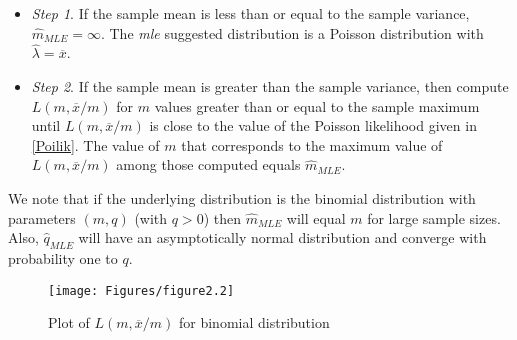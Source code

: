 \documentclass[]{book}
\providecommand{\tightlist}{%
  \setlength{\itemsep}{0pt}\setlength{\parskip}{0pt}}
\theoremstyle{definition}
\theoremstyle{definition}
\theoremstyle{definition}
\theoremstyle{remark}
\begin{document}
\begin{itemize}
\tightlist
\item
  \emph{Step 1}. If the sample mean is less than or equal to the sample
  variance, \(\hat{m}_{MLE}=\infty\). The \emph{mle} suggested
  distribution is a Poisson distribution with
  \(\hat{\lambda}=\overline{x}\).
\item
  \emph{Step 2}. If the sample mean is greater than the sample variance,
  then compute \(L(m,\overline{x}/m)\) for \(m\) values greater than or
  equal to the sample maximum until \(L(m,\overline{x}/m)\) is close to
  the value of the Poisson likelihood given in \eqref{Poilik}. The value
  of \(m\) that corresponds to the maximum value of
  \(L(m,\overline{x}/m)\) among those computed equals \(\hat{m}_{MLE}\).
\end{itemize}

We note that if the underlying distribution is the binomial distribution
with parameters \((m,q)\) (with \(q>0\)) then \(\hat{m}_{MLE}\) will
equal \(m\) for large sample sizes. Also, \(\hat{q}_{MLE}\) will have an
asymptotically normal distribution and converge with probability one to
\(q\).

\begin{figure}

{\centering \texttt{[image: Figures/figure2.2]} 

}

\caption{Plot of $L(m,\overline{x}/m)$ for binomial distribution}\label{fig:MLEm}
\end{figure}
\end{document}
